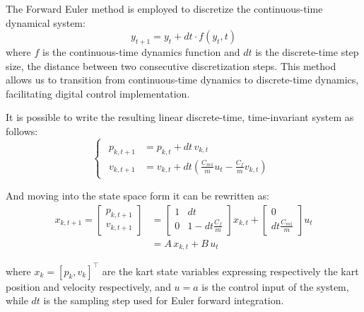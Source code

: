 \documentclass[a4paper,12pt,oneside]{book}
\begin{document}
\bigskip
The Forward Euler method is employed to discretize the continuous-time dynamical system:
\begin{equation}
    y_{t+1} = y_t + dt \cdot f(y_t, t) 
\end{equation}
where $f$ is the continuous-time dynamics function and $dt$ is the discrete-time step size, the distance between two consecutive discretization steps.
This method allows us to transition from continuous-time dynamics to discrete-time dynamics, facilitating digital control implementation.

It is possible to write the resulting linear discrete-time, time-invariant system as follows:
\begin{equation}
\begin{cases}
	\begin{aligned}
		p_{k,t+1} &= p_{k,t} + dt \, v_{k,t} \\
		v_{k,t+1} &= v_{k,t} + dt \left( \frac{C_{m1}}{m} u_t - \frac{C_f}{m} v_{k,t}  \right)
	\end{aligned}
\end{cases}
\end{equation}

And moving into the state space form it can be rewritten as:
\begin{equation}
    \begin{aligned}
    	x_{k,t+1} = 
    		\begin{bmatrix}
    			p_{k,t+1} \\
    			v_{k,t+1}
    		\end{bmatrix}
    		& =
    		\begin{bmatrix}
    			1 & dt \\
    			0 & 1-dt\frac{C_f}{m}
    		\end{bmatrix}
    		x_{k,t}
    		+
    		\begin{bmatrix}
    			0 \\
    			dt \frac{C_{m1}}{m}
    		\end{bmatrix}
    		u_t \\
    		& = A \, x_{k,t} + B \, u_t
    \end{aligned}
\label{Linear_system}
\end{equation}

where $x_k = [p_k , v_k] ^\top$  are the kart state variables expressing respectively the kart position and velocity respectively, and $u = a$ is the control input of the system, while $dt$ is the sampling step used for Euler forward integration.
\end{document}
